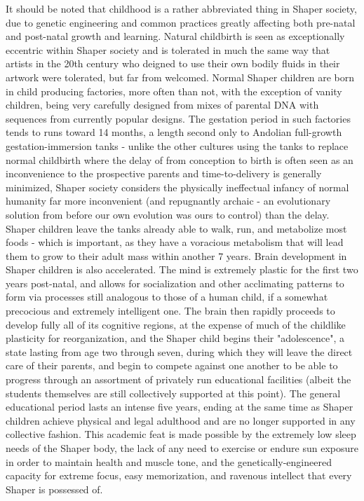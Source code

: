 It should be noted that childhood is a rather abbreviated thing in
Shaper society, due to genetic engineering and common practices
greatly affecting both pre-natal and post-natal growth and
learning. Natural childbirth is seen as exceptionally eccentric within
Shaper society and is tolerated in much the same way that artists in
the 20th century who deigned to use their own bodily fluids in their
artwork were tolerated, but far from welcomed. Normal Shaper children
are born in child producing factories, more often than not, with the
exception of vanity children, being very carefully designed from mixes
of parental DNA with sequences from currently popular designs. The
gestation period in such factories tends to runs toward 14 months, a
length second only to Andolian full-growth gestation-immersion tanks -
unlike the other cultures using the tanks to replace normal childbirth
where the delay of from conception to birth is often seen as an
inconvenience to the prospective parents and time-to-delivery is
generally minimized, Shaper society considers the physically
ineffectual infancy of normal humanity far more inconvenient (and
repugnantly archaic - an evolutionary solution from before our own
evolution was ours to control) than the delay. Shaper children leave
the tanks already able to walk, run, and metabolize most foods - which
is important, as they have a voracious metabolism that will lead them
to grow to their adult mass within another 7 years. Brain development
in Shaper children is also accelerated. The mind is extremely plastic
for the first two years post-natal, and allows for socialization and
other acclimating patterns to form via processes still analogous to
those of a human child, if a somewhat precocious and extremely
intelligent one. The brain then rapidly proceeds to develop fully all
of its cognitive regions, at the expense of much of the childlike
plasticity for reorganization, and the Shaper child begins their
"adolescence", a state lasting from age two through seven, during
which they will leave the direct care of their parents, and begin to
compete against one another to be able to progress through an
assortment of privately run educational facilities (albeit the
students themselves are still collectively supported at this
point). The general educational period lasts an intense five years,
ending at the same time as Shaper children achieve physical and legal
adulthood and are no longer supported in any collective fashion. This
academic feat is made possible by the extremely low sleep needs of the
Shaper body, the lack of any need to exercise or endure sun exposure
in order to maintain health and muscle tone, and the
genetically-engineered capacity for extreme focus, easy memorization,
and ravenous intellect that every Shaper is possessed of.

